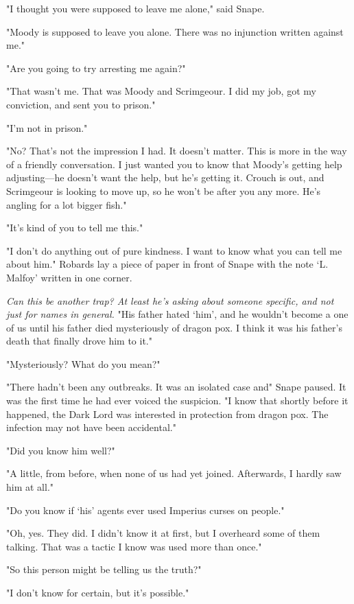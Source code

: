 "I thought you were supposed to leave me alone," said Snape.

"Moody is supposed to leave you alone. There was no injunction written against me."

"Are you going to try arresting me again?"

"That wasn't me. That was Moody and Scrimgeour. I did my job, got my conviction, and sent you to prison."

"I'm not in prison."

"No? That's not the impression I had. It doesn't matter. This is more in the way of a friendly conversation. I just wanted you to know that Moody's getting help adjusting—he doesn't want the help, but he's getting it. Crouch is out, and Scrimgeour is looking to move up, so he won't be after you any more. He's angling for a lot bigger fish."

"It's kind of you to tell me this."

"I don't do anything out of pure kindness. I want to know what you can tell me about him." Robards lay a piece of paper in front of Snape with the note `L. Malfoy' written in one corner.

\emph{Can this be another trap? At least he's asking about someone specific, and not just for names in general.} "His father hated{\el} `him', and he wouldn't become a{\el} one of us until his father died mysteriously of dragon pox. I think it was his father's death that finally drove him to it."

"Mysteriously? What do you mean?"

"There hadn't been any outbreaks. It was an isolated case and{\el}" Snape paused. It was the first time he had ever voiced the suspicion. "I know that shortly before it happened, the Dark Lord was interested in protection from dragon pox. The infection may not have been accidental."

"Did you know him well?"

"A little, from before, when none of us had yet joined. Afterwards, I hardly saw him at all."

"Do you know if{\el} `his' agents ever used Imperius curses on people."

"Oh, yes. They did. I didn't know it at first, but I overheard some of them talking. That was a tactic I know was used more than once."

"So this person might be telling us the truth?"

"I don't know for certain, but it's possible."

